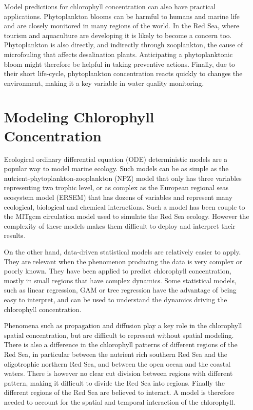 Model predictions for chlorophyll concentration can also have practical applications. Phytoplankton blooms can be harmful to humans and marine life and are closely monitored in many regions of the world. In the Red Sea, where tourism and aquaculture are developing it is likely to become a concern too. Phytoplankton is also directly, and indirectly through zooplankton, the cause of microfouling that affects desalination plants. Anticipating a phytoplanktonic bloom might therefore be helpful in taking preventive actions. Finally, due to their short life-cycle, phytoplankton concentration reacts quickly to changes the environment, making it a  key variable in water quality monitoring.

\section{Modeling Chlorophyll Concentration}

Ecological ordinary differential equation (ODE) deterministic models are a popular way to model marine ecology. Such models can be as simple as the nutrient-phytoplankton-zooplankton (NPZ) model that only has three variables representing two trophic level, or as complex as the European regional seas ecosystem model (ERSEM) that has dozens of variables and represent many ecological, biological and chemical interactions. Such a model has been couple to the MITgcm circulation model used to simulate the Red Sea ecology. However the complexity of these models makes them difficult to deploy and interpret their results. 

On the other hand, data-driven statistical models are relatively easier to apply. They are relevant when the phenomenon producing the data is very complex or poorly known. They have been applied to predict chlorophyll concentration, mostly in small regions that have complex dynamics. Some statistical models, such as linear regression, GAM or tree regression have the advantage of being easy to interpret, and can be used to understand the dynamics driving the chlorophyll concentration.

Phenomena such as propagation and diffusion play a key role in the chlorophyll spatial concentration, but are difficult to represent without spatial modeling. There is also a difference in the chlorophyll patterns of different regions of the Red Sea, in particular between the nutrient rich southern Red Sea and the oligotrophic northern Red Sea, and between the open ocean and the coastal waters. There is however no clear cut division between regions with different pattern, making it difficult to divide the Red Sea into regions. Finally the different regions of the Red Sea are believed to interact. A model is therefore needed to account for the spatial and temporal interaction of the chlorophyll.


